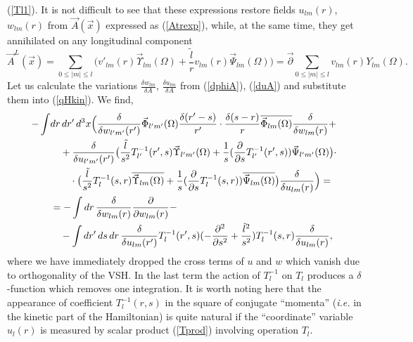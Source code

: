 \documentclass[12pt]{article}
\newcommand{\pl}{\partial}
\newcommand{\ol}{\overline}
\begin{document}
(\ref{Tl1}).
	It is not difficult to see that these expressions restore fields
$ u_{lm}(r) $,
$ w_{lm}(r) $ from
$ \vec{A}(\vec{x}) $
	expressed as 
(\ref{Atrexp}),
    while, at the same time, they get annihilated on any longitudinal component
\begin{equation*}
    \vec{A}^{L}(\vec{x}) = \sum_{0\leq |m| \leq l} \bigl(
	v'_{lm}(r)\vec{\Upsilon}_{lm}(\Omega) +\frac{\tilde{l}}{r}v_{lm}(r)
	    \vec{\Psi}_{lm}(\Omega)\bigr)
    = \vec{\partial} \sum_{0\leq |m|\leq l} v_{lm}(r) Y_{lm}(\Omega).
\end{equation*}
	Let us calculate the variations
$ \frac{\delta w_{lm}}{\delta A} $,
$ \frac{\delta u_{lm}}{\delta A} $
	from
(\ref{dphiA}),
(\ref{duA}) and substitute them into
(\ref{qHkin}).
	We find,
\begin{align*}
    -\int& dr\, dr'\, d^{3}x \Bigl(\frac{\delta}{\delta w_{l'm'}(r')}
\vec{\Phi}_{l'm'}(\Omega) \frac{\delta(r'-s)}{r'} \cdot
	\frac{\delta(s-r)}{r} \ol{\vec{\Phi}_{lm}(\Omega)}
	    \frac{\delta}{\delta w_{lm}(r)}
    +\\
&\quad +\frac{\delta}{\delta u_{l'm'}(r')}
    \bigl(\frac{\tilde{l}}{s^{2}} T_{l'}^{-1}(r',s)
	\vec{\Upsilon}_{l'm'}(\Omega)
    +\frac{1}{s}(\frac{\pl}{\pl s}T_{l'}^{-1}(r',s))\vec{\Psi}_{l'm'}(\Omega)
	\bigr)\cdot \\
&\quad\quad \cdot \bigl(\frac{\tilde{l}}{s^{2}}T_{l}^{-1}(s,r)
    \ol{\vec{\Upsilon}_{lm}(\Omega)} +\frac{1}{s}(\frac{\pl}{\pl s}
    T_{l}^{-1}(s,r))\ol{\vec{\Psi}_{lm}(\Omega)} \bigr)
	\frac{\delta}{\delta u_{lm}(r)} \Bigr) =\\
&= -\int dr\, \frac{\delta}{\delta w_{lm}(r)} \frac{\pl}{\pl w_{lm}(r)} -\\
&\quad    -\int dr'\, ds\, dr\, \frac{\delta}{\delta u_{lm}(r')}
    T_{l}^{-1}(r',s)
    (-\frac{\pl^{2}}{\pl s^{2}}+\frac{\tilde{l}^{2}}{s^{2}})
    T_{l}^{-1}(s,r) \frac{\delta}{\delta u_{lm}(r)} ,
\end{align*}
	where we have immediately dropped the cross terms of
$ u $ and
$ w $
	which vanish due to orthogonality of the VSH.
	In the last term the action of
$ T_{l}^{-1} $ on
$ T_{l} $
	produces a
$ \delta $-function
	which removes one integration.
	It is worth noting here that the appearance of coefficient
$ T_{l}^{-1}(r,s) $
	in the square of conjugate ``momenta''
	({\it i.e.} in the kinetic part of the Hamiltonian) is quite natural
	if the ``coordinate'' variable 
$ u_{l}(r) $
	is measured by scalar product
(\ref{Tprod})
	involving operation
$ T_{l} $.
\end{document}
